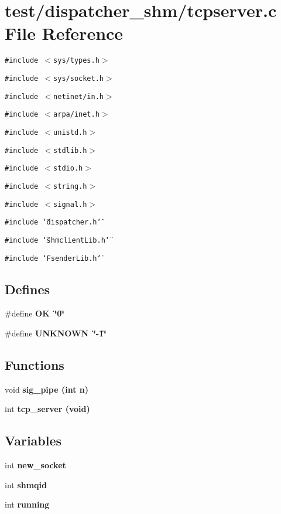 \section{test/dispatcher\_\-shm/tcpserver.c File Reference}
\label{dispatcher__shm_2tcpserver_8c}
{\tt \#include $<$sys/types.h$>$}\par
{\tt \#include $<$sys/socket.h$>$}\par
{\tt \#include $<$netinet/in.h$>$}\par
{\tt \#include $<$arpa/inet.h$>$}\par
{\tt \#include $<$unistd.h$>$}\par
{\tt \#include $<$stdlib.h$>$}\par
{\tt \#include $<$stdio.h$>$}\par
{\tt \#include $<$string.h$>$}\par
{\tt \#include $<$signal.h$>$}\par
{\tt \#include \char`\"{}dispatcher.h\char`\"{}}\par
{\tt \#include \char`\"{}shmclient\-Lib.h\char`\"{}}\par
{\tt \#include \char`\"{}Fsender\-Lib.h\char`\"{}}\par
\subsection*{Defines}
\begin{CompactItemize}
\item 
\#define \bf{OK}~\char`\"{}0\char`\"{}
\item 
\#define \bf{UNKNOWN}~\char`\"{}-1\char`\"{}
\end{CompactItemize}
\subsection*{Functions}
\begin{CompactItemize}
\item 
void \bf{sig\_\-pipe} (int \bf{n})
\item 
int \bf{tcp\_\-server} (void)
\end{CompactItemize}
\subsection*{Variables}
\begin{CompactItemize}
\item 
int \bf{new\_\-socket}
\item 
int \bf{shmqid}
\item 
int \bf{running}
\end{CompactItemize}


